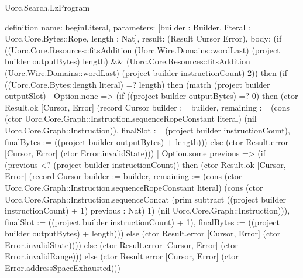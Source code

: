 \begin{lexlean}{Uorc.Search.LzProgram}
\begin{semanticmodule}
definition{
  name: beginLiteral,
  parameters: [builder : Builder, literal : Uorc.Core.Bytes::Rope, length : Nat],
  result: (Result Cursor Error),
  body: (if ((Uorc.Core.Resources::fitsAddition (Uorc.Wire.Domains::wordLast) (project builder outputBytes) length) && (Uorc.Core.Resources::fitsAddition (Uorc.Wire.Domains::wordLast) (project builder instructionCount) 2)) then (if ((Uorc.Core.Bytes::length literal) =? length) then (match (project builder outputSlot)
    | Option.none => (if ((project builder outputBytes) =? 0) then (ctor Result.ok [Cursor, Error] (record Cursor {builder := builder, remaining := (cons (ctor Uorc.Core.Graph::Instruction.sequenceRopeConstant literal) (nil Uorc.Core.Graph::Instruction)), finalSlot := (project builder instructionCount), finalBytes := ((project builder outputBytes) + length)})) else (ctor Result.error [Cursor, Error] (ctor Error.invalidState)))
    | Option.some previous => (if (previous <? (project builder instructionCount)) then (ctor Result.ok [Cursor, Error] (record Cursor {builder := builder, remaining := (cons (ctor Uorc.Core.Graph::Instruction.sequenceRopeConstant literal) (cons (ctor Uorc.Core.Graph::Instruction.sequenceConcat (prim subtract ((project builder instructionCount) + 1) previous : Nat) 1) (nil Uorc.Core.Graph::Instruction))), finalSlot := ((project builder instructionCount) + 1), finalBytes := ((project builder outputBytes) + length)})) else (ctor Result.error [Cursor, Error] (ctor Error.invalidState)))) else (ctor Result.error [Cursor, Error] (ctor Error.invalidRange))) else (ctor Result.error [Cursor, Error] (ctor Error.addressSpaceExhausted)))
}


\end{semanticmodule}
\end{lexlean}

